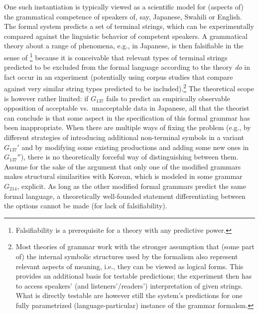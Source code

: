 \documentclass[output=paper,hidelinks]{langscibook}
\begin{document}
One such instantiation is typically viewed as a scientific model for (aspects of) the grammatical competence of speakers of, say, Japanese, Swahili or English. The formal system predicts a set of terminal strings, which can be experimentally compared against the linguistic behavior of competent speakers. A grammatical theory about a range of phenomena, e.g., in Japanese, is then falsifiable in the sense of \citet{Popper1959}\footnote{Falsifiability is a prerequisite for a theory with any predictive power.} because it is conceivable that relevant types of terminal strings predicted to be excluded from the formal language according to the theory \emph{do} in fact occur in an experiment (potentially using corpus studies that compare against very similar string types predicted to be included).\footnote{Most theories of grammar work with the stronger assumption that (some part of) the internal symbolic structures used by the formalism also represent relevant aspects of meaning, i.e., they can be viewed as logical forms. This provides an additional basis for testable predictions; the experiment then has to access speakers' (and listeners'/readers') interpretation of given strings. What is directly testable are however still the system's predictions for one fully parametrized (language-particular) instance of the grammar formalsm.} The theoretical scope is however rather limited: if $G_{137}$ fails to predict an empirically observable opposition of acceptable vs.\ unacceptable data in Japanese, all that the theorist can conclude is that some aspect in the specification of this formal grammar has been inappropriate.  When there are multiple ways of fixing the problem (e.g., by different strategies of introducing additional non-terminal symbols in a variant $G_{137}'$ and by modifying some existing productions and adding some new ones in $G_{137}''$), there is no theoretically forceful way of distinguishing between them. Assume for the sake of the argument that only one of the modified grammars makes structural similarities with Korean, which is modeled in some grammar $G_{214}$, explicit. As long as the other modified formal grammars predict the same formal language, a theoretically well-founded statement differentiating between the options cannot be made (for lack of falsifiability).
\end{document}
